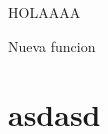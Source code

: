 H\+O\+L\+A\+A\+AA

Nueva funcion \hypertarget{Shifter.c_asdasd}{}\section{asdasd}\label{Shifter.c_asdasd}
